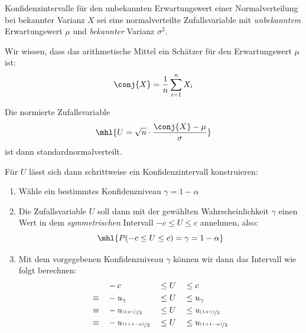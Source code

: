 \begin{algo}{Konfidenzintervalle für den unbekannten Erwartungswert einer Normalverteilung bei bekannter Varianz}
    $X$ sei eine normalverteilte Zufallsvariable mit \emph{unbekanntem} Erwartungswert $\mu$ und \emph{bekannter} Varianz $\sigma^2$.

    Wir wissen, dass das arithmetische Mittel ein Schätzer für den Erwartungswert $\mu$ ist:
    \[
        \conj{X} = \frac{1}{n} \sum_{i=1}^{n} X_i
    \]

    Die normierte Zufallsvariable
    \[
        \mhl{U = \sqrt{n} \cdot \frac{\conj{X} - \mu}{\sigma}}
    \]
    ist dann standardnormalverteilt.


    Für $U$ lässt sich dann schrittweise ein Konfidenzintervall konstruieren:
    \begin{enumerate}
        \item Wähle ein bestimmtes Konfidenzniveau $\gamma = 1 - \alpha$
        \item Die Zufallsvariable $U$ soll dann mit der gewählten Wahrscheinlichkeit $\gamma$ einen Wert in dem \emph{symmetrischen} Intervall $-c \leq U \leq c$ annehmen, also:
              \[
                  \mhl{P(-c \leq U \leq c) = \gamma = 1 - \alpha}
              \]
        \item Mit dem vorgegebenen Konfidenzniveau $\gamma$ können wir dann das Intervall wie folgt berechnen:
              \begin{alignat*}{3}
                               & -c                                                                    &  & \leq U                                            &  & \leq c                                                                     \\
                  \equiv \quad & -u_{\gamma}                                                           &  & \leq U                                            &  & \leq u_{\gamma}                                                            \\
                  \equiv \quad & -u_{\nicefrac{(1+\gamma)}{2}}                                         &  & \leq U                                            &  & \leq u_{\nicefrac{(1+\gamma)}{2}}                                          \\
                  \equiv \quad & -u_{\nicefrac{(1+1 - \alpha)}{2}}                                     &  & \leq U                                            &  & \leq u_{\nicefrac{(1+1 - \alpha)}{2}}                                      \\

\end{alignat*}
\end{enumerate}
\end{algo}

